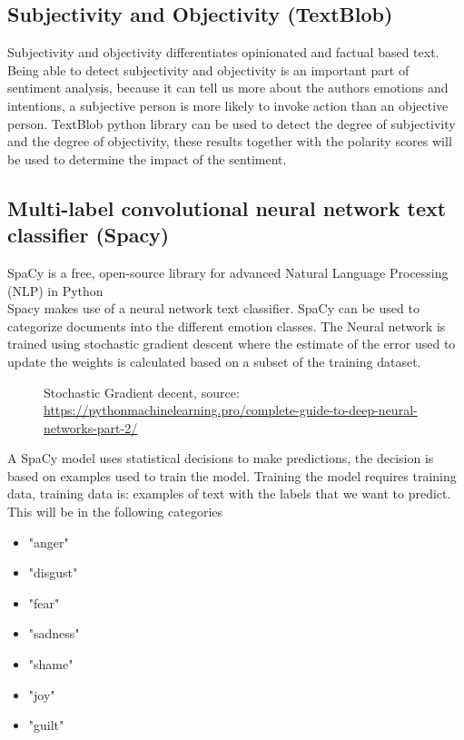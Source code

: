 \clearpage
\subsection{Subjectivity and Objectivity (TextBlob)}
Subjectivity and objectivity differentiates opinionated and factual based text. \cite{ref2}
Being able to detect subjectivity and objectivity is an important part of sentiment analysis, because it can tell us more about the authors emotions and intentions, a subjective person is more likely to invoke action than an objective person. TextBlob python library can be used to detect the degree of subjectivity and the degree of objectivity, these results together with the polarity scores will be used to determine the impact of the sentiment. 


\subsection{Multi-label convolutional neural network text classifier (Spacy)}

SpaCy is a free, open-source library for advanced Natural Language Processing (NLP) in Python \\
Spacy makes use of a neural network text classifier. SpaCy can be used to categorize documents into the different emotion classes.
The Neural network is trained using stochastic gradient descent where the estimate of the error used to update the weights is calculated based on a subset of the training dataset. \\


\begin{figure}[h]
  \centering
  \caption[Stochastic gradient descent]%
  {Stochastic Gradient decent, source: \url{https://pythonmachinelearning.pro/complete-guide-to-deep-neural-networks-part-2/}}
  \label{fig:ALAP:sm3}
\end{figure}






A SpaCy model uses statistical decisions to make predictions, the decision is based on examples used to train the model. Training the model requires training data, training data is: examples of text with the labels that we want to predict. This will be in the following categories
\begin{itemize}
\item "anger"
\item "disgust"
\item "fear"
\item "sadness"
\item "shame"
\item "joy"
\item "guilt"
\end{itemize}




